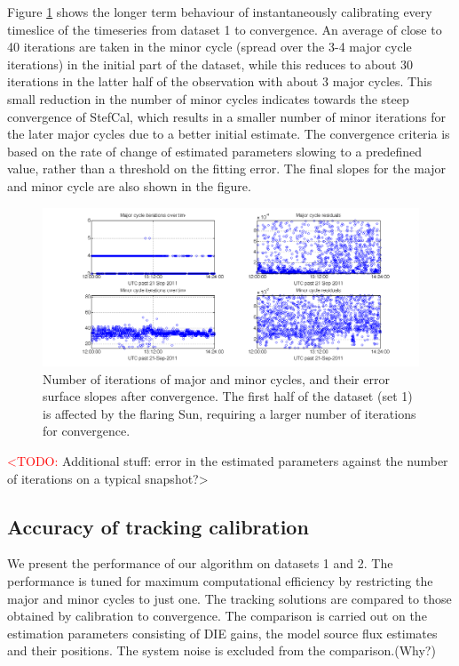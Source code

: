 \documentclass{aa}
\begin{document}
Figure   \ref{fig:Major-and-minor}   shows   the   longer  term   behaviour   of
instantaneously calibrating every timeslice of  the timeseries from dataset 1 to
convergence. An average  of close to 40 iterations are taken  in the minor cycle
(spread over the 3-4 major cycle iterations) in the initial part of the dataset,
while this reduces to about 30  iterations in the latter half of the observation
with about  3 major cycles. This small  reduction in the number  of minor cycles
indicates towards the  steep convergence of StefCal, which  results in a smaller
number of  minor iterations for the later  major cycles due to  a better initial
estimate. The convergence  criteria is based on the rate  of change of estimated
parameters slowing to a predefined value, rather than a threshold on the fitting
error. The  final slopes for  the major  and minor cycle  are also shown  in the
figure.

\begin{figure}[tbh]
\includegraphics[width=0.9\paperwidth]{Figs/SB000_iter_resid_lsimg_wo_short_blines}

\caption{\label{fig:Major-and-minor}Number of iterations of major and minor
cycles, and their error surface slopes after convergence. The first
half of the dataset (set 1) is affected by the flaring Sun, requiring
a larger number of iterations for convergence.}
\end{figure}


\textcolor{red}{<TODO:} Additional stuff: error in the estimated parameters
against the number of iterations on a typical snapshot?>


\subsection{Accuracy of tracking calibration}

We present the performance of our algorithm on datasets 1 and 2. The performance
is tuned for maximum computational efficiency by restricting the major and minor
cycles to  just one. The  tracking solutions are  compared to those  obtained by
calibration  to convergence.  The comparison  is carried  out on  the estimation
parameters consisting  of DIE gains, the  model source flux  estimates and their
positions. The system noise is excluded from the comparison.(Why?)
\end{document}
